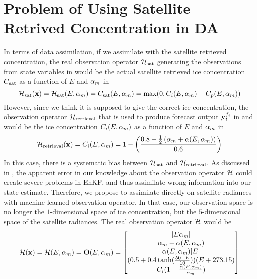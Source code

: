 \section{Problem of Using Satellite Retrived Concentration in DA}\label{sec:csatproblem}
\par In terms of data assimilation, if we assimilate with the satellite retrieved concentration, the real observation operator $\mathcal{H}_{\text{sat}}$ generating the observations from state variables in  would be the actual satellite retrieved ice concentration $C_{\text{sat}}$ as a function of $E$ and $\alpha_m$ in 
\begin{equation}\label{eq:realcsat}
\mathcal{H}_{\text{sat}}(\textbf{x}) = \mathcal{H}_{\text{sat}}(E,\alpha_m) = C_{\text{sat}}(E,\alpha_m) = \max(0,C_i(E,\alpha_m)-C_p(E,\alpha_m))
\end{equation}
However, since we think it is supposed to give the correct ice concentration, the observation operator $\mathcal{H}_{\text{retrieval}}$ that is used to produce forecast output $\textbf{y}_t^{f_i}$ in  and  would be the ice concentration $C_i(E,\alpha_m)$ as a function of $E$ and $\alpha_m$ in 
\begin{equation}\label{eq:supposedcsat}
\mathcal{H}_{\text{retrieval}}(\textbf{x}) = C_i(E,\alpha_m) = 1-\left(\frac{0.8-\frac{1}{2}\left( \alpha_m+\alpha(E,\alpha_m)\right)}{0.6}\right)
\end{equation}
In this case, there is a systematic bias between $\mathcal{H}_{\text{sat}}$ and $\mathcal{H}_{\text{retrieval}}$. As discussed in , the apparent error in our knowledge about the observation operator $\mathcal{H}$ could create severe problems in EnKF, and thus assimilate wrong information into our state estimate. Therefore, we propose to assimilate directly on satellite radiances with machine learned observation operator. In that case, our observation space is no longer the $1$-dimensional space of ice concentration, but the $5$-dimensional space of the satellite radiances. The real observation operator $\mathcal{H}$ would be
\begin{equation}\label{eq:hreal}
\mathcal{H}(\textbf{x}) = \mathcal{H}(E,\alpha_m) = \textbf{O}(E,\alpha_m) = 
\begin{bmatrix}
|E\alpha_m|\\ 
\alpha_m-\alpha(E,\alpha_m) \\
\alpha(E,\alpha_m)|E|\\
(0.5+0.4\tanh(\frac{50-E}{10}))(E+273.15)\\
C_i (1-\frac{\alpha(E,\alpha_m)}{\alpha_m})
\end{bmatrix}
\end{equation}
